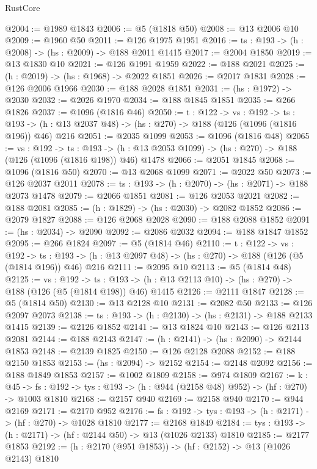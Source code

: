 \begin{lexlean}{RustCore}
\begin{coremodule}
@2004 := @1989 @1843
@2006 := @5 (@1818 @50)
@2008 := @13 @2006 @10
@2009 := @1960 @50
@2011 := @126 @1975 @1951
@2016 := {ts : @193} -> (h : @2008) -> (hs : @2009) -> @188 @2011 @1415
@2017 := @2004 @1850
@2019 := @13 @1830 @10
@2021 := @126 @1991 @1959
@2022 := @188 @2021
@2025 := (h : @2019) -> (hs : @1968) -> @2022 @1851
@2026 := @2017 @1831
@2028 := @126 @2006 @1966
@2030 := @188 @2028 @1851
@2031 := (hs : @1972) -> @2030
@2032 := @2026 @1970
@2034 := @188 @1845 @1851
@2035 := @266 @1826
@2037 := @1096 (@1816 @46)
@2050 := {t : @122} ->
  {vs : @192} ->
  {ts : @193} -> (h : @13 @2037 @48) -> (hs : @270) -> @188 (@126 (@1096 (@1816 @196)) @46) @216
@2051 := @2035 @1099
@2053 := @1096 (@1816 @48)
@2065 := {vs : @192} ->
  {ts : @193} -> (h : @13 @2053 @1099) -> (hs : @270) -> @188 (@126 (@1096 (@1816 @198)) @46) @1478
@2066 := @2051 @1845
@2068 := @1096 (@1816 @50)
@2070 := @13 @2068 @1099
@2071 := @2022 @50
@2073 := @126 @2037 @2011
@2078 := {ts : @193} -> (h : @2070) -> (hs : @2071) -> @188 @2073 @1478
@2079 := @2066 @1851
@2081 := @126 @2053 @2021
@2082 := @188 @2081
@2085 := (h : @1829) -> (hs : @2030) -> @2082 @1852
@2086 := @2079 @1827
@2088 := @126 @2068 @2028
@2090 := @188 @2088 @1852
@2091 := (hs : @2034) -> @2090
@2092 := @2086 @2032
@2094 := @188 @1847 @1852
@2095 := @266 @1824
@2097 := @5 (@1814 @46)
@2110 := {t : @122} ->
  {vs : @192} ->
  {ts : @193} -> (h : @13 @2097 @48) -> (hs : @270) -> @188 (@126 (@5 (@1814 @196)) @46) @216
@2111 := @2095 @10
@2113 := @5 (@1814 @48)
@2125 := {vs : @192} ->
  {ts : @193} -> (h : @13 @2113 @10) -> (hs : @270) -> @188 (@126 (@5 (@1814 @198)) @46) @1415
@2126 := @2111 @1847
@2128 := @5 (@1814 @50)
@2130 := @13 @2128 @10
@2131 := @2082 @50
@2133 := @126 @2097 @2073
@2138 := {ts : @193} -> (h : @2130) -> (hs : @2131) -> @188 @2133 @1415
@2139 := @2126 @1852
@2141 := @13 @1824 @10
@2143 := @126 @2113 @2081
@2144 := @188 @2143
@2147 := (h : @2141) -> (hs : @2090) -> @2144 @1853
@2148 := @2139 @1825
@2150 := @126 @2128 @2088
@2152 := @188 @2150 @1853
@2153 := (hs : @2094) -> @2152
@2154 := @2148 @2092
@2156 := @188 @1849 @1853
@2157 := @1002 @1809
@2158 := @974 @1809
@2167 := {k : @45} ->
  {fs : @192} -> {tys : @193} -> (h : @944 (@2158 @48) @952) -> (hf : @270) -> @1003 @1810
@2168 := @2157 @940
@2169 := @2158 @940
@2170 := @944 @2169
@2171 := @2170 @952
@2176 := {fs : @192} -> {tys : @193} -> (h : @2171) -> (hf : @270) -> @1028 @1810
@2177 := @2168 @1849
@2184 := {tys : @193} -> (h : @2171) -> (hf : @2144 @50) -> @13 (@1026 @2133) @1810
@2185 := @2177 @1853
@2192 := (h : @2170 (@951 @1853)) -> (hf : @2152) -> @13 (@1026 @2143) @1810

\end{coremodule}
\end{lexlean}
